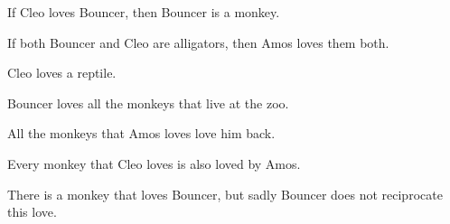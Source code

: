 \begin{earg}
\item If Cleo loves Bouncer, then Bouncer is a monkey.
\item[] 
\item If both Bouncer and Cleo are alligators, then Amos loves them both.
\item[] 
\item Cleo loves a reptile.
\item[] 
\item Bouncer loves all the monkeys that live at the zoo.
\item[] \item All the monkeys that Amos loves love him back.
\item[] 
\item Every monkey that Cleo loves is also loved by Amos.
\item[] 
\item There is a monkey that loves Bouncer, but sadly Bouncer does not reciprocate this love.
\item[] 
\end{earg}

